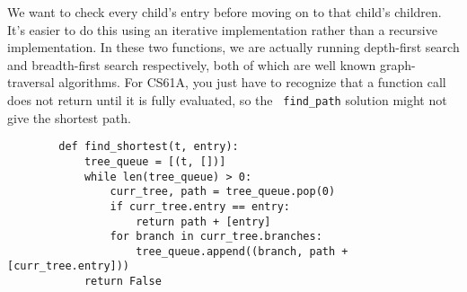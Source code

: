         \begin{solution}[4.5in]
        We want to check every child's entry before moving on to that child's
        children.  It's easier to do this using an iterative implementation
        rather than a recursive implementation. In these two functions, we are
        actually running depth-first search and breadth-first search
        respectively, both of which are well known graph-traversal algorithms.
        For CS61A, you just have to recognize that a function call does not
        return until it is fully evaluated, so the \texttt{
        find\_path} solution might not give the shortest path.

        \begin{lstlisting}
        def find_shortest(t, entry):
            tree_queue = [(t, [])]
            while len(tree_queue) > 0:
                curr_tree, path = tree_queue.pop(0)
                if curr_tree.entry == entry:
                    return path + [entry]
                for branch in curr_tree.branches:
                    tree_queue.append((branch, path + [curr_tree.entry]))
            return False
        \end{lstlisting}
        \end{solution}
